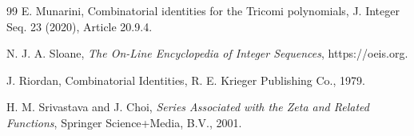 \documentclass[11pt,reqno]{amsart}
\theoremstyle{plain}
\numberwithin{equation}{section}
\begin{document}
\begin{thebibliography}{99}
E. Munarini, Combinatorial identities for the Tricomi polynomials, J. Integer Seq. 23 (2020), Article 20.9.4. 

N. J. A. Sloane, \emph{The On-Line Encyclopedia of Integer Sequences}, https://oeis.org.

J. Riordan, Combinatorial Identities, R. E. Krieger Publishing Co., 1979.

H. M. Srivastava and J. Choi, \emph{Series Associated with the Zeta and Related Functions}, Springer Science+Media, B.V., 2001.


\end{thebibliography}
\end{document}
